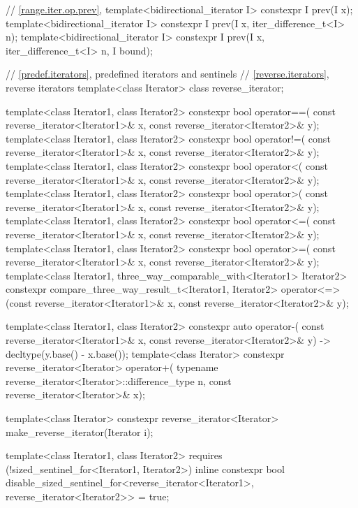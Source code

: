 \begin{codeblock}
{{    // \ref{range.iter.op.prev}, 
    template<bidirectional_iterator I>
      constexpr I prev(I x);
    template<bidirectional_iterator I>
      constexpr I prev(I x, iter_difference_t<I> n);
    template<bidirectional_iterator I>
      constexpr I prev(I x, iter_difference_t<I> n, I bound);
  }

  // \ref{predef.iterators}, predefined iterators and sentinels
  // \ref{reverse.iterators}, reverse iterators
  template<class Iterator> class reverse_iterator;

  template<class Iterator1, class Iterator2>
    constexpr bool operator==(
      const reverse_iterator<Iterator1>& x,
      const reverse_iterator<Iterator2>& y);
  template<class Iterator1, class Iterator2>
    constexpr bool operator!=(
      const reverse_iterator<Iterator1>& x,
      const reverse_iterator<Iterator2>& y);
  template<class Iterator1, class Iterator2>
    constexpr bool operator<(
      const reverse_iterator<Iterator1>& x,
      const reverse_iterator<Iterator2>& y);
  template<class Iterator1, class Iterator2>
    constexpr bool operator>(
      const reverse_iterator<Iterator1>& x,
      const reverse_iterator<Iterator2>& y);
  template<class Iterator1, class Iterator2>
    constexpr bool operator<=(
      const reverse_iterator<Iterator1>& x,
      const reverse_iterator<Iterator2>& y);
  template<class Iterator1, class Iterator2>
    constexpr bool operator>=(
      const reverse_iterator<Iterator1>& x,
      const reverse_iterator<Iterator2>& y);
  template<class Iterator1, three_way_comparable_with<Iterator1> Iterator2>
    constexpr compare_three_way_result_t<Iterator1, Iterator2>
      operator<=>(const reverse_iterator<Iterator1>& x,
                  const reverse_iterator<Iterator2>& y);

  template<class Iterator1, class Iterator2>
    constexpr auto operator-(
      const reverse_iterator<Iterator1>& x,
      const reverse_iterator<Iterator2>& y) -> decltype(y.base() - x.base());
  template<class Iterator>
    constexpr reverse_iterator<Iterator>
      operator+(
    typename reverse_iterator<Iterator>::difference_type n,
    const reverse_iterator<Iterator>& x);

  template<class Iterator>
    constexpr reverse_iterator<Iterator> make_reverse_iterator(Iterator i);

  template<class Iterator1, class Iterator2>
      requires (!sized_sentinel_for<Iterator1, Iterator2>)
    inline constexpr bool disable_sized_sentinel_for<reverse_iterator<Iterator1>,
                                                     reverse_iterator<Iterator2>> = true;

}
\end{codeblock}
